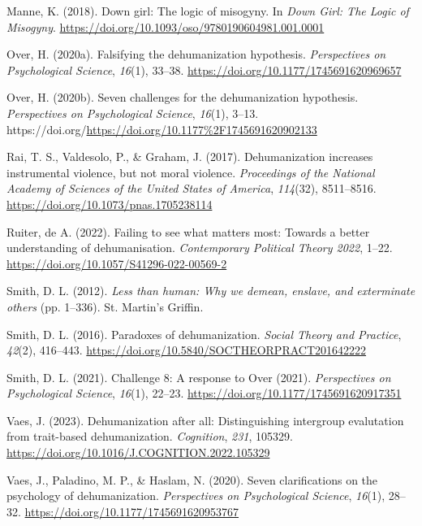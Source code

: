 \documentclass[
]{article}
\newlength{\cslhangindent}
\newlength{\cslentryspacingunit} %
\newenvironment{CSLReferences}[2] %
 {%
  \setlength{\parindent}{0pt}
  \ifodd #1
  \let\oldpar\par
  \def\par{\hangindent=\cslhangindent\oldpar}
  \fi
  \setlength{\parskip}{#2\cslentryspacingunit}
 }%
 {}
\begin{document}
\begin{CSLReferences}{1}{0}
\leavevmode{}%
Manne, K. (2018). Down girl: The logic of misogyny. In \emph{Down Girl: The Logic of Misogyny}. \url{https://doi.org/10.1093/oso/9780190604981.001.0001}

\leavevmode{}%
Over, H. (2020a). Falsifying the dehumanization hypothesis. \emph{Perspectives on Psychological Science}, \emph{16}(1), 33--38. \url{https://doi.org/10.1177/1745691620969657}

\leavevmode{}%
Over, H. (2020b). Seven challenges for the dehumanization hypothesis. \emph{Perspectives on Psychological Science}, \emph{16}(1), 3--13. https://doi.org/\url{https://doi.org/10.1177\%2F1745691620902133}

\leavevmode{}%
Rai, T. S., Valdesolo, P., \& Graham, J. (2017). Dehumanization increases instrumental violence, but not moral violence. \emph{Proceedings of the National Academy of Sciences of the United States of America}, \emph{114}(32), 8511--8516. \url{https://doi.org/10.1073/pnas.1705238114}

\leavevmode{}%
Ruiter, de A. (2022). Failing to see what matters most: Towards a better understanding of dehumanisation. \emph{Contemporary Political Theory 2022}, 1--22. \url{https://doi.org/10.1057/S41296-022-00569-2}

\leavevmode{}%
Smith, D. L. (2012). \emph{Less than human: Why we demean, enslave, and exterminate others} (pp. 1--336). St. Martin's Griffin.

\leavevmode{}%
Smith, D. L. (2016). Paradoxes of dehumanization. \emph{Social Theory and Practice}, \emph{42}(2), 416--443. \url{https://doi.org/10.5840/SOCTHEORPRACT201642222}

\leavevmode{}%
Smith, D. L. (2021). Challenge 8: A response to {Over} (2021). \emph{Perspectives on Psychological Science}, \emph{16}(1), 22--23. \url{https://doi.org/10.1177/1745691620917351}

\leavevmode{}%
Vaes, J. (2023). Dehumanization after all: Distinguishing intergroup evalutation from trait-based dehumanization. \emph{Cognition}, \emph{231}, 105329. \url{https://doi.org/10.1016/J.COGNITION.2022.105329}

\leavevmode{}%
Vaes, J., Paladino, M. P., \& Haslam, N. (2020). Seven clarifications on the psychology of dehumanization. \emph{Perspectives on Psychological Science}, \emph{16}(1), 28--32. \url{https://doi.org/10.1177/1745691620953767}

\end{CSLReferences}
\end{document}
